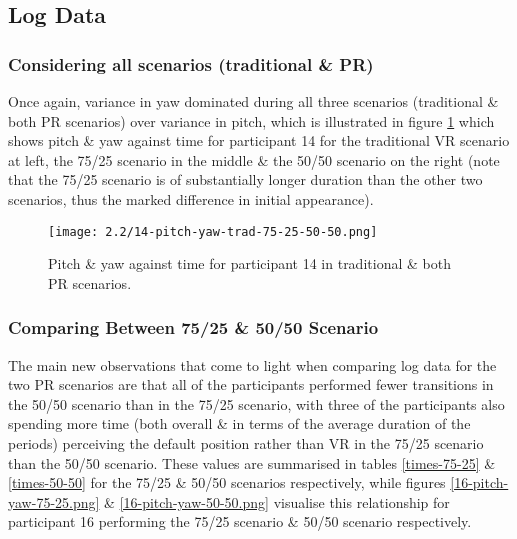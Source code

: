 
\subsection{Log Data}

\subsubsection{Considering all scenarios (traditional \& PR)}

Once again, variance in yaw dominated during all three scenarios (traditional \& both PR scenarios) over variance in pitch, which is illustrated in figure \ref{14-pitch-yaw-trad-75-25-50-50.png} which shows pitch \& yaw against time for participant 14 for the traditional VR scenario at left, the 75/25 scenario in the middle \& the 50/50 scenario on the right (note that the 75/25 scenario is of substantially longer duration than the other two scenarios, thus the marked difference in initial appearance).

\begin{figure}[h]
	\begin{center}
	\texttt{[image: 2.2/14-pitch-yaw-trad-75-25-50-50.png]}
	\caption{Pitch \& yaw against time for participant 14 in traditional \& both PR scenarios.}
	\label{14-pitch-yaw-trad-75-25-50-50.png}
	\end{center}
\end{figure}


\subsubsection{Comparing Between 75/25 \& 50/50 Scenario}

The main new observations that come to light when comparing log data for the two PR scenarios are that all of the participants performed fewer transitions in the 50/50 scenario than in the 75/25 scenario, with three of the participants also spending more time (both overall \& in terms of the average duration of the periods) perceiving the default position rather than VR in the 75/25 scenario than the 50/50 scenario. These values are summarised in tables \ref{times-75-25} \& \ref{times-50-50} for the 75/25 \& 50/50 scenarios respectively, while figures \ref{16-pitch-yaw-75-25.png} \& \ref{16-pitch-yaw-50-50.png} visualise this relationship for participant 16 performing the 75/25 scenario \& 50/50 scenario respectively.

